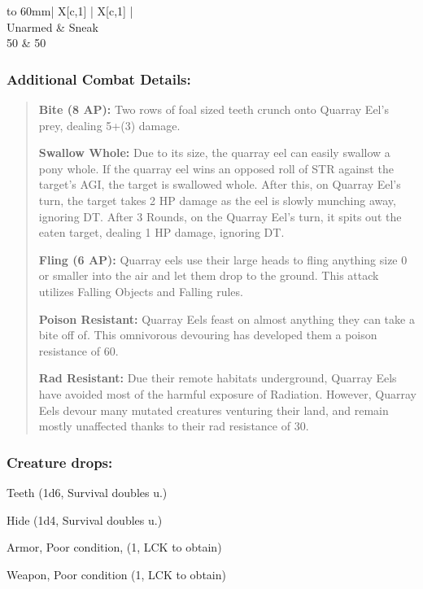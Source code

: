 \documentclass[11pt,a4paper,twocolumn]{book}
\begin{document}
	\bigskip
	{
		\begin{tabu} to 60mm{| X[c,1] | X[c,1] |}
			\hline
			 \\ \hline
			Unarmed & Sneak                          \\
			50      & 50                             \\ \hline
		\end{tabu}
		
	}	
	
	\subsubsection*{Additional Combat Details:}
	\begin{verse}
		\textbf{Bite (8 AP):} Two rows of foal sized teeth crunch onto Quarray Eel's prey, dealing 5+(3) damage.
		
		\textbf{Swallow Whole:} Due to its size, the quarray eel can easily swallow a pony whole. If the quarray eel wins an opposed roll of STR against the target's AGI, the target is swallowed whole. After this, on Quarray Eel's turn, the target takes 2 HP damage as the eel is slowly munching away, ignoring DT. After 3 Rounds, on the Quarray Eel's turn, it spits out the eaten target, dealing 1 HP damage, ignoring DT.
		
		\textbf{Fling (6 AP):} Quarray eels use their large heads to fling anything size 0 or smaller into the air and let them drop to the ground. This attack utilizes Falling Objects and Falling rules.
		
		\textbf{Poison Resistant:} Quarray Eels feast on almost anything they can take a bite off of. This omnivorous devouring has developed them a poison resistance of 60.
		
		\textbf{Rad Resistant:} Due their remote habitats underground, Quarray Eels have avoided most of the harmful exposure of Radiation. However, Quarray Eels devour many mutated creatures venturing their land, and remain mostly unaffected thanks to their rad resistance of 30.
	\end{verse}
	
	\subsubsection*{Creature drops:}
	\begin{compactitem}
		\item Teeth (1d6, Survival doubles u.)
		\item Hide (1d4, Survival doubles u.)
		\item Armor, Poor condition, (1, LCK to obtain)
		\item Weapon, Poor condition (1, LCK to obtain)
	\end{compactitem}
	
\end{document}
